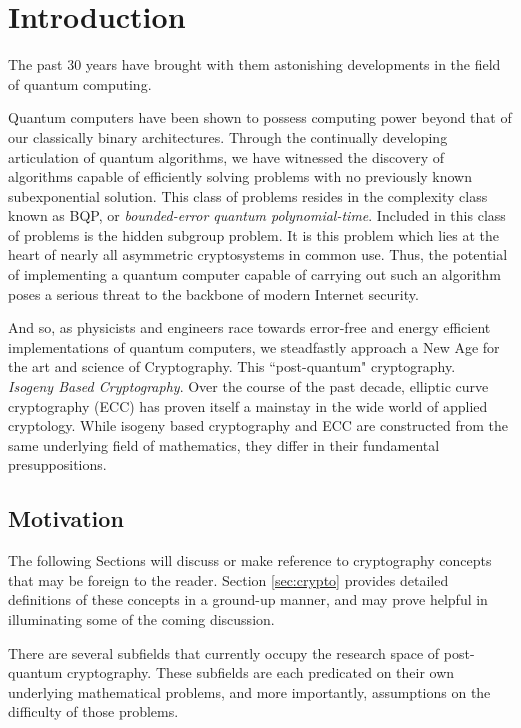 \chapter{Introduction}

The past 30 years have brought with them astonishing developments in the field of quantum computing.

Quantum computers have been shown to possess computing power beyond that of our classically binary architectures. Through the continually developing articulation of quantum algorithms, we have witnessed the discovery of algorithms capable of efficiently solving problems with no previously known subexponential solution. This class of problems resides in the complexity class known as BQP, or \textit{bounded-error quantum polynomial-time}. Included in this class of problems is the hidden subgroup problem. It is this problem which lies at the heart of nearly all asymmetric cryptosystems in common use. Thus, the potential of implementing a quantum computer capable of carrying out such an algorithm poses a serious threat to the backbone of modern Internet security.  

And so, as physicists and engineers race towards error-free and energy efficient implementations of quantum computers, we steadfastly approach a New Age for the art and science of Cryptography. This ``post-quantum" cryptography.\\

\noindent
\textit{Isogeny Based Cryptography}. Over the course of the past decade, elliptic curve cryptography (ECC) has proven itself a mainstay in the wide world of applied cryptology. While isogeny based cryptography and ECC are constructed from the same underlying field of mathematics, they differ in their fundamental presuppositions.


\section{Motivation}
\label{sec:motivation}

The following Sections will discuss or make reference to cryptography concepts that may be foreign to the reader. Section  \ref{sec:crypto} provides detailed definitions of these concepts in a ground-up manner, and may prove helpful in illuminating some of the coming discussion.

There are several subfields that currently occupy the research space of post-quantum cryptography. These subfields are each predicated on their own underlying mathematical problems, and more importantly, assumptions on the difficulty of those problems.

